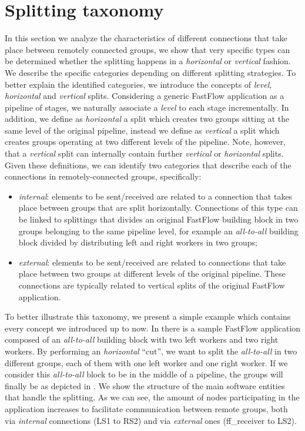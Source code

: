 \section{Splitting taxonomy}
In this section we analyze the characteristics of different connections that take place between remotely connected groups, we show that very specific types can be determined whether the splitting happens in a \textit{horizontal} or \textit{vertical} fashion. We describe the specific categories depending on different splitting strategies. To better explain the identified categories, we introduce the concepts of \textit{level}, \textit{horizontal} and \textit{vertical} splits. Considering a generic FastFlow application as a pipeline of stages, we naturally associate a \textit{level} to each stage incrementally. In addition, we define as \textit{horizontal} a split which creates two groups sitting at the same level of the original pipeline, instead we define as \textit{vertical} a split which creates groups operating at two different levels of the pipeline. Note, however, that a \textit{vertical} split can internally contain further \textit{vertical} or \textit{horizontal} splits. Given these definitions, we can identify two categories that describe each of the connections in remotely-connected groups, specifically:
\begin{itemize}
    \item \textit{internal}: elements to be sent/received are related to a connection that takes place between groups that are split horizontally. Connections of this type can be linked to splittings that divides an original FastFlow building block in two groups belonging to the same pipeline level, for example an \textit{all-to-all} building block divided by distributing left and right workers in two groups;
    \item \textit{external}: elements to be sent/received are related to connections that take place between two groups at different levels of the original pipeline. These connections are typically related to vertical splits of the original FastFlow application.
\end{itemize}

To better illustrate this taxonomy, we present a simple example which contains every concept we introduced up to now. In  there is a sample FastFlow application composed of an \textit{all-to-all} building block with two left workers and two right workers. By performing an \textit{horizontal} ``cut'', we want to split the \textit{all-to-all} in two different groups, each of them with one left worker and one right worker. If we consider this \textit{all-to-all} block to be in the middle of a pipeline, the groups will finally be as depicted in . We show the structure of the main software entities that handle the splitting. As we can see, the amount of nodes participating in the application increases to facilitate communication between remote groups, both via \textit{internal} connections (LS1 to RS2) and via \textit{external} ones (ff\_receiver to LS2).\newline

